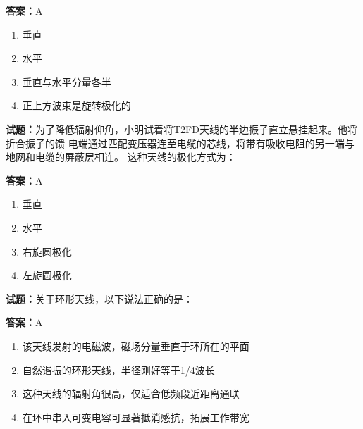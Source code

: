 \documentclass{ctexbook}
\begin{document}
\textbf{答案：}A 

\begin{enumerate}[leftmargin=3em]
  \item 垂直 

  \item 水平 

  \item 垂直与水平分量各半 

  \item 正上方波束是旋转极化的 

\end{enumerate}





\vspace{1em}

\textbf{试题：}为了降低辐射仰角，小明试着将T2FD天线的半边振子直立悬挂起来。他将折合振子的馈
电端通过匹配变压器连至电缆的芯线，将带有吸收电阻的另一端与地网和电缆的屏蔽层相连。
这种天线的极化方式为： 

\textbf{答案：}A 

\begin{enumerate}[leftmargin=3em]
  \item 垂直 

  \item 水平 

  \item 右旋圆极化 

  \item 左旋圆极化 

\end{enumerate}





\vspace{1em}

\textbf{试题：}关于环形天线，以下说法正确的是： 

\textbf{答案：}A 

\begin{enumerate}[leftmargin=3em]
  \item 该天线发射的电磁波，磁场分量垂直于环所在的平面 

  \item 自然谐振的环形天线，半径刚好等于1/4波长 

  \item 这种天线的辐射角很高，仅适合低频段近距离通联 

  \item 在环中串入可变电容可显著抵消感抗，拓展工作带宽 

\end{enumerate}
\end{document}
